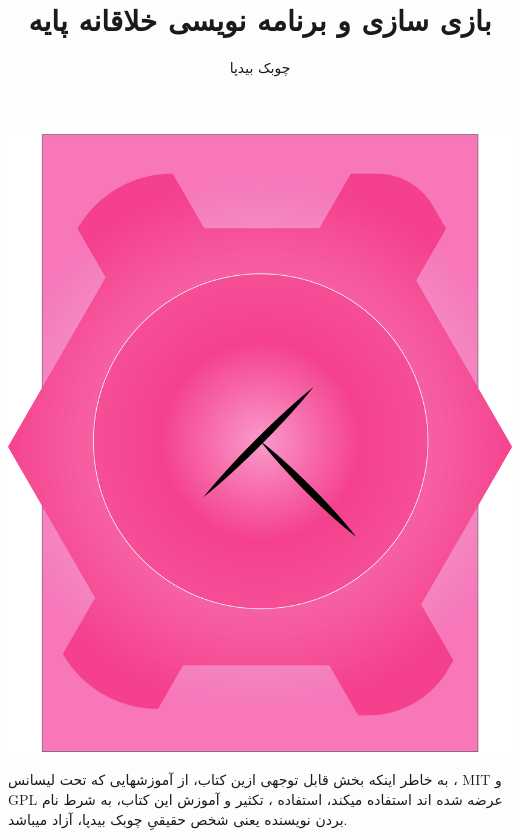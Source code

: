 \documentclass[14pt,a4paper]{memoir}
\begin{document}
		
\frontmatter
	
	\title{ بازی سازی و برنامه نویسی خلاقانه پایه}
	\author{چوبک بیدپا}
	\date{}
	\clearpage\maketitle
	\thispagestyle{empty}
	\includegraphics[scale=0.6]{Cover}	
	\newpage
	
		
	\begin{center}
	
	 
	 \end{center}
 
 
	 \vfill
	 
	 به خاطر اینکه بخش قابل توجهی ازین کتاب، از آموزشهایی که تحت لیسانس ، MIT و GPL عرضه شده اند استفاده میکند، استفاده ، تکثیر و آموزش این کتاب، به شرط نام بردن نویسنده یعنی شخص حقیقیِ چوبک بیدپا، آزاد میباشد.
	 
\end{document}
